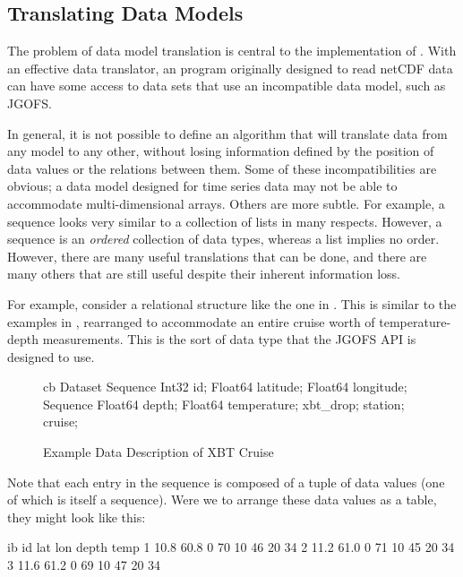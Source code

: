 \subsection{Translating Data Models}
\label{data,trans}

The problem of data model translation is central to the implementation
of \opendap. With an effective data translator, an \opendap program originally
designed to read netCDF data can have some access to data sets that
use an incompatible data model, such as JGOFS.

In general, it is not possible to define an algorithm that will
translate data from any model to any other, without losing information
defined by the position of data values or the relations between them.
Some of these incompatibilities are obvious; a data model designed for
time series data may not be able to accommodate multi-dimensional
arrays.  Others are more subtle.  For example, a sequence looks very
similar to a collection of lists in many respects.  However, a
sequence is an \emph{ordered} collection of data types, whereas a list
implies no order.  However, there are many useful translations that
can be done, and there are many others that are still useful despite
their inherent information loss.

For example, consider a relational structure like the one in
. This is similar to the examples in
, rearranged to accommodate an entire cruise
worth of temperature-depth measurements.  This is the sort of data type
that the JGOFS API is designed to use.

\begin{figure}[htbp]
\begin{vcode}{cb}
Dataset {
   Sequence {
      Int32 id;
      Float64 latitude;
      Float64 longitude;
      Sequence {
         Float64 depth;
         Float64 temperature;
      } xbt_drop;
   } station;
} cruise;
\end{vcode}
\caption{Example Data Description of XBT Cruise}
\label{fig,data,XBT-DDS-ex}
\end{figure}

Note that each entry in the  sequence is composed of a
tuple of data values (one of which is itself a sequence). Were we to
arrange these data values as a table, they might look like this:

\begin{vcode}{ib}
id   lat   lon   depth  temp
1   10.8   60.8    0     70
                  10     46
                  20     34
2   11.2   61.0    0     71
                  10     45
                  20     34
3   11.6   61.2    0     69
                  10     47
                  20     34
\end{vcode}

